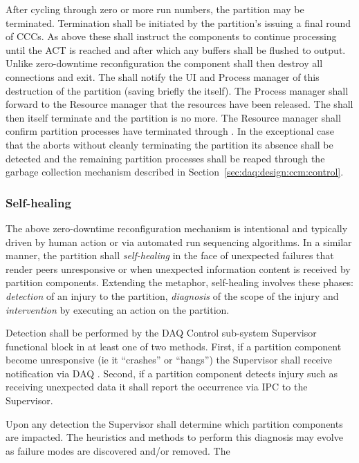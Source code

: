 After cycling through zero or more run numbers, the partition may be terminated. 
Termination shall be initiated by the partition's  issuing a final round of CCCs. 
As above these shall instruct the components to continue processing until the ACT is reached and after which any buffers shall be flushed to output. 
Unlike zero-downtime reconfiguration the component shall then destroy all connections and exit. 
The  shall notify the UI and Process manager of this destruction of the partition (saving briefly the  itself). 
The Process manager shall forward to the Resource manager that the resources have been released. 
The  shall then itself terminate and the partition is no more.
The Resource manager shall confirm partition processes have terminated through . 
In the exceptional case that the  aborts without cleanly terminating the partition its absence shall be detected and the remaining partition processes shall be reaped through the garbage collection mechanism described in Section~\ref{sec:daq:design:ccm:control}.

\subsubsection{Self-healing}
\label{sec:daq:self-healing}

The above zero-downtime reconfiguration mechanism is intentional and typically driven by human action or via automated run sequencing algorithms. 
In a similar manner, the partition shall \textit{self-healing} in the face of unexpected failures that render peers unresponsive or when unexpected information content is received by partition components.  
Extending the metaphor, self-healing involves these phases: \textit{detection} of an injury to the partition, \textit{diagnosis} of the scope of the injury and \textit{intervention} by executing an action on the partition.

Detection shall be performed by the DAQ Control sub-system Supervisor functional block in at least one of two methods.
First, if a partition component become unresponsive (ie it ``crashes'' or ``hangs'') the Supervisor shall receive notification via DAQ . 
Second, if a partition component detects injury such as receiving unexpected data it shall report the occurrence via IPC to the Supervisor.

Upon any detection the Supervisor shall determine which partition components are impacted.  The heuristics and methods to perform this diagnosis may evolve as failure modes are discovered and/or removed.  The 

